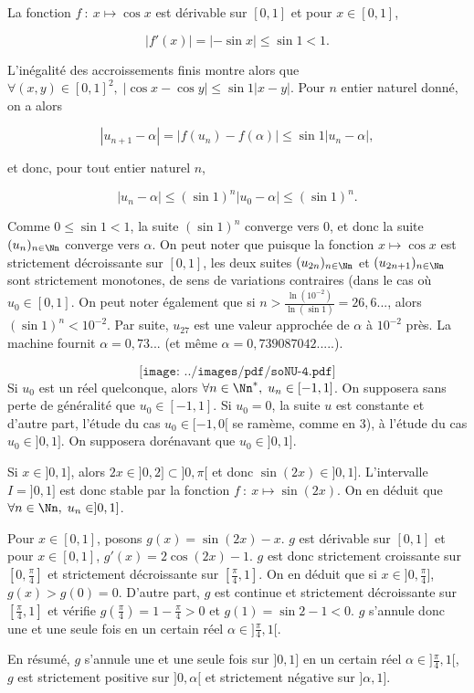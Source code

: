 {{La fonction $f~:~x\mapsto\cos x$ est dérivable sur $[0,1]$ et pour $x\in[0,1]$,

$$|f'(x)|=|-\sin x|\leq\sin1<1.$$

L'inégalité des accroissements finis montre alors que $\forall(x,y)\in[0,1]^2,\;|\cos x-\cos y|\leq\sin1|x-y|$. Pour $n$ entier naturel donné, on a alors

$$|u_{n+1}-\alpha|=|f(u_n)-f(\alpha)|\leq\sin1|u_n-\alpha|,$$

et donc, pour tout entier naturel $n$,

$$|u_n-\alpha|\leq(\sin1)^n|u_0-\alpha|\leq(\sin1)^n.$$

Comme $0\leq\sin1<1$, la suite $(\sin1)^n$ converge vers $0$, et donc la suite $(u_n)_{n\in\Nn}$ converge vers $\alpha$. On peut noter que puisque la fonction $x\mapsto\cos x$ est strictement décroissante sur $[0,1]$, les deux suites $(u_{2n})_{n\in\Nn}$ et $(u_{2n+1})_{n\in\Nn}$ sont strictement monotones, de sens de variations contraires (dans le cas où $u_0\in[0,1]$. On peut noter également que si $n>\frac{\ln(10^{-2})}{\ln(\sin1)}=26,6...$, alors $(\sin1)^n<10^{-2}$. Par suite, $u_{27}$ est une valeur approchée de $\alpha$ à $10^{-2}$ près. La machine fournit $\alpha=0,73...$ (et même $\alpha=0,739087042.....$).

$$\texttt{[image: ../images/pdf/soNU-4.pdf]}$$
Si $u_0$ est un réel quelconque, alors $\forall n\in\Nn^*,\;u_n\in[-1,1]$. On supposera sans perte de généralité que $u_0\in[-1,1]$. Si $u_0=0$, la suite $u$ est constante et d'autre part, l'étude du cas $u_0\in[-1,0[$ se ramème, comme en 3), à l'étude du cas $u_0\in]0,1]$. On supposera dorénavant que $u_0\in]0,1]$.

Si $x\in]0,1]$, alors $2x\in]0,2]\subset]0,\pi[$ et donc $\sin(2x)\in]0,1]$. L'intervalle $I=]0,1]$ est donc stable par la fonction $f~:~x\mapsto\sin(2x)$. On en déduit que $\forall n\in\Nn,\;u_n\in]0,1]$.

Pour $x\in[0,1]$, posons $g(x)=\sin(2x)-x$. $g$ est dérivable sur $[0,1]$ et pour $x\in[0,1]$, $g'(x)=2\cos(2x)-1$. $g$ est donc strictement croissante sur $[0,\frac{\pi}{4}]$ et strictement décroissante sur $[\frac{\pi}{4},1]$. On en déduit que si $x\in]0,\frac{\pi}{4}]$, $g(x)>g(0)=0$. D'autre part, $g$ est continue et strictement décroissante sur $[\frac{\pi}{4},1]$ et vérifie $g(\frac{\pi}{4})=1-\frac{\pi}{4}>0$ et $g(1)=\sin2-1<0$. $g$ s'annule donc une et une seule fois en un certain réel $\alpha\in]\frac{\pi}{4},1[$.

En résumé, $g$ s'annule une et une seule fois sur $]0,1]$ en un certain réel $\alpha\in]\frac{\pi}{4},1[$, $g$ est strictement positive sur $]0,\alpha[$ et strictement négative sur $]\alpha,1]$.

}}
